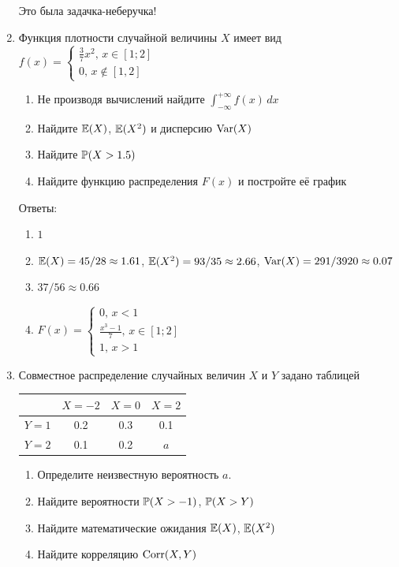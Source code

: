 \documentclass[12pt, a4paper]{article}\usepackage[]{graphicx}\usepackage[]{color}
\begin{document}
\begin{enumerate}
Это была задачка-неберучка!


\item Функция плотности случайной величины $X$ имеет вид $f(x)=\left\{\begin{array}{l}
\frac{3}{7}x^2,\, x\in[1;2] \\
0,\, x\notin [1,2]
\end{array}\right.$
\begin{enumerate}
\item Не производя вычислений найдите $\int_{-\infty}^{+\infty}f(x)\,dx$
\item Найдите $\E(X)$, $\E(X^2)$ и дисперсию $\Var(X)$
\item Найдите $\P(X>1.5)$
\item Найдите функцию распределения $F(x)$ и постройте её график
\end{enumerate}

Ответы:
\begin{enumerate}
\item $1$
\item $\E(X)=45/28\approx 1.61$, $\E(X^2)=93/35\approx 2.66$, $\Var(X)=291/3920\approx 0.07$
\item $37/56\approx 0.66$
\item $F(x)=\begin{cases} 0,\, x<1 \\
\frac{x^3-1}{7},\, x\in [1;2] \\
1,\, x>1 \end{cases}$
\end{enumerate}

\item Совместное распределение случайных величин $X$ и $Y$ задано таблицей

\begin{tabular}{c|ccc}
 & $X=-2$ & $X=0$ & $X=2$ \\
\hline
$Y=1$ & 0.2 & 0.3 & 0.1 \\
$Y=2$ & 0.1 & 0.2 & $a$ \\
\end{tabular}

\begin{enumerate}
\item Определите неизвестную вероятность $a$.
\item Найдите вероятности $\P(X>-1)$, $\P(X>Y)$
\item Найдите математические ожидания $\E(X)$, $\E(X^2)$
\item Найдите корреляцию $\Corr(X,Y)$
\end{enumerate}


\end{enumerate}
\end{document}
